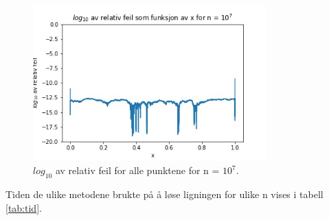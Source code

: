\documentclass[reprint,english,notitlepage]{revtex4-1}
\begin{document}
	\begin{figure}[H]
		\includegraphics[width=90mm]{../Results/relErr7.jpg}
		\caption{$log_{10}$ av relativ feil for alle punktene for n = $10^7$.}
		\label{fig:relErr7}
	\end{figure}

	Tiden de ulike metodene brukte på å løse ligningen for ulike n vises i tabell \ref{tab:tid}. 
	
\end{document}
